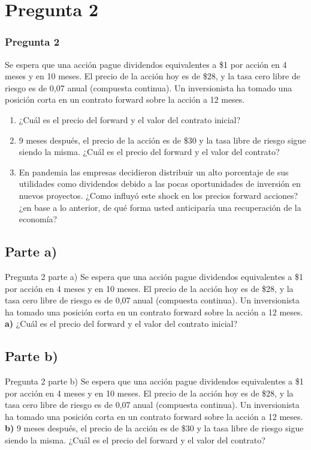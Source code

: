 \documentclass{beamer}
\begin{document}
\section{Pregunta 2}
\begin{frame}

    \frametitle{Pregunta 2}
    Se espera que una acción pague dividendos equivalentes a \$1 por acción en 4 meses y en 10 meses.
    El precio de la acción hoy es de \$28, y la tasa cero libre de riesgo es de 0,07 anual (compuesta continua).
    Un inversionista ha tomado una posición corta en un contrato forward sobre la acción a 12 meses.

  \begin{enumerate}[label=\textbf{\alph*)}]
  \item   ¿Cuál es el precio del forward y el valor del contrato inicial?
  \item   9 meses después, el precio de la acción es de \$30 y la tasa libre de riesgo sigue siendo la misma.
  ¿Cuál es el precio del forward y el valor del contrato?
  \item   En pandemia las empresas decidieron distribuir un alto porcentaje de sus utilidades como dividendos 
  debido a las pocas oportunidades de inversión en nuevos proyectos. ¿Como influyó este shock en los precios 
  forward acciones? ¿en base a lo anterior, de qué forma usted anticiparía una recuperación de la economía?
  \end{enumerate}
\end{frame}

\subsection{Parte a)}
\begin{frame}{Pregunta 2 parte a)}
  Se espera que una acción pague dividendos equivalentes a \$1 por acción en 4 meses y en 10 meses.
  El precio de la acción hoy es de \$28, y la tasa cero libre de riesgo es de 0,07 anual (compuesta continua).
  Un inversionista ha tomado una posición corta en un contrato forward sobre la acción a 12 meses.\\
  \textbf{a)} ¿Cuál es el precio del forward y el valor del contrato inicial?  
\end{frame}

\subsection{Parte b)}
\begin{frame}{Pregunta 2 parte b)}
  Se espera que una acción pague dividendos equivalentes a \$1 por acción en 4 meses y en 10 meses.
  El precio de la acción hoy es de \$28, y la tasa cero libre de riesgo es de 0,07 anual (compuesta continua).
  Un inversionista ha tomado una posición corta en un contrato forward sobre la acción a 12 meses.\\
  \textbf{b)} 9 meses después, el precio de la acción es de \$30 y la tasa libre de riesgo sigue siendo la misma.
  ¿Cuál es el precio del forward y el valor del contrato?
\end{frame}
\end{document}
